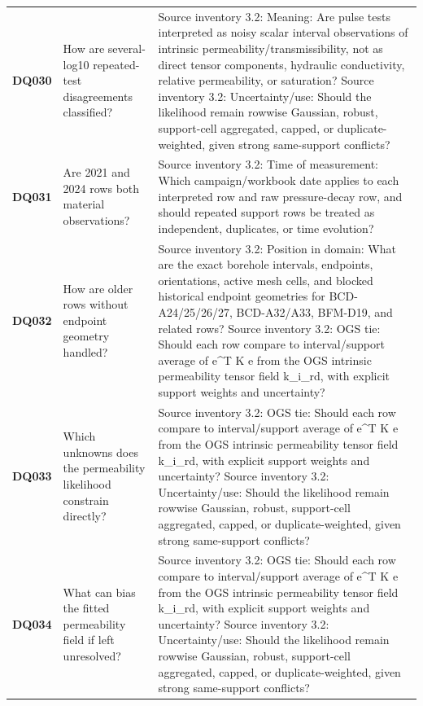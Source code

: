 \begin{longtable}{@{}L{0.09\textwidth} L{0.31\textwidth} L{0.52\textwidth}@{}}
\addlinespace[0.18em]
\textbf{DQ030} & How are several-log10 repeated-test disagreements classified? & Source inventory 3.2: Meaning: Are pulse tests interpreted as noisy scalar interval observations of intrinsic permeability/transmissibility, not as direct tensor components, hydraulic conductivity, relative permeability, or saturation? Source inventory 3.2: Uncertainty/use: Should the likelihood remain rowwise Gaussian, robust, support-cell aggregated, capped, or duplicate-weighted, given strong same-support conflicts?\\
\addlinespace[0.18em]
\textbf{DQ031} & Are 2021 and 2024 rows both material observations? & Source inventory 3.2: Time of measurement: Which campaign/workbook date applies to each interpreted row and raw pressure-decay row, and should repeated support rows be treated as independent, duplicates, or time evolution?\\
\addlinespace[0.18em]
\textbf{DQ032} & How are older rows without endpoint geometry handled? & Source inventory 3.2: Position in domain: What are the exact borehole intervals, endpoints, orientations, active mesh cells, and blocked historical endpoint geometries for BCD-A24/25/26/27, BCD-A32/A33, BFM-D19, and related rows? Source inventory 3.2: OGS tie: Should each row compare to interval/support average of e\textasciicircum{}T K e from the OGS intrinsic permeability tensor field k\_i\_rd, with explicit support weights and uncertainty?\\
\addlinespace[0.18em]
\textbf{DQ033} & Which unknowns does the permeability likelihood constrain directly? & Source inventory 3.2: OGS tie: Should each row compare to interval/support average of e\textasciicircum{}T K e from the OGS intrinsic permeability tensor field k\_i\_rd, with explicit support weights and uncertainty? Source inventory 3.2: Uncertainty/use: Should the likelihood remain rowwise Gaussian, robust, support-cell aggregated, capped, or duplicate-weighted, given strong same-support conflicts?\\
\addlinespace[0.18em]
\textbf{DQ034} & What can bias the fitted permeability field if left unresolved? & Source inventory 3.2: OGS tie: Should each row compare to interval/support average of e\textasciicircum{}T K e from the OGS intrinsic permeability tensor field k\_i\_rd, with explicit support weights and uncertainty? Source inventory 3.2: Uncertainty/use: Should the likelihood remain rowwise Gaussian, robust, support-cell aggregated, capped, or duplicate-weighted, given strong same-support conflicts?\\

\end{longtable}
